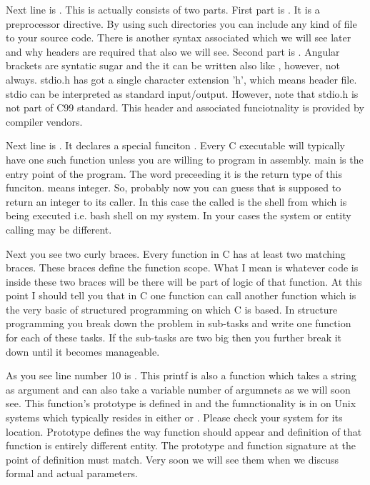 Next line is . This is actually consists of two parts.
First part is . It is a preprocessor directive. By using such 
directories you can include any kind of file to your source code. There is another
syntax associated which we will see later and why headers are required that also we
will see. Second part is . Angular brackets are syntatic sugar and
the it can be written also like , however, not always. stdio.h has
got a single character extension 'h', which means header file. stdio can be 
interpreted as standard input/output. However, note that stdio.h is not part of C99
standard. This header and associated funciotnality is provided by compiler vendors.

Next line is . It declares a special funciton . Every
C executable will typically have one such function unless you are willing to
program in assembly. main is the entry point of the program. The word 
preceeding it is the return type of this funciton.  means integer. So,
probably now you can guess that  is supposed to return an integer to its
caller. In this case the called is the shell from which  is being
executed i.e. bash shell on my system. In your cases the system or entity calling
 may be different. 

Next you see two curly braces. Every function in C has at least two matching 
braces. These braces define the function scope. What I mean is whatever code is 
inside these two braces will be there will be part of logic of that function. At
this point I should tell you that in C one function can call another function which
is the very basic of structured programming on which C is based. In structure
programming you break down the problem in sub-tasks and write one function for each
of these tasks. If the sub-tasks are two big then you further break it down until
it becomes manageable.

As you see line number 10 is . This printf is also
a function which takes a string as argument and can also take a variable number of
argumnets as we will soon see. This function's prototype is defined in 
 and the fumnctionality is in  on Unix systems which
typically resides in either  or . Please check your 
system for its location. Prototype defines the way function should appear and 
definition of that function is entirely different entity. The prototype and 
function signature at the point of definition must match. Very soon we will see 
them when we discuss formal and actual parameters.

